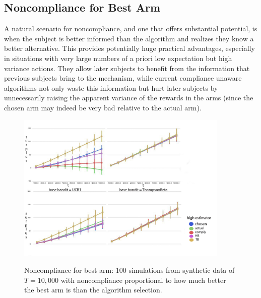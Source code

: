 \subsection{Noncompliance for Best Arm}


A natural scenario for noncompliance, and one that offers substantial potential, is when the subject is better informed than the algorithm and realizes they know a better alternative. 
This provides potentially huge practical advantages, especially in situations with very large numbers of a priori low expectation but high variance actions. 
They allow later subjects to benefit from the information that previous subjects bring to the mechanism, while current compliance unaware algorithms not only waste this information but hurt later subjects by unnecessarily raising the apparent variance of the rewards in the arms (since the chosen arm may indeed be very bad relative to the actual arm).



\begin{figure}[t]
	\centering	
	\includegraphics[width=0.9\textwidth]{bandit/figs/ex4.png}\hspace{1cm}
	\label{fig:ex4}
	\caption{Noncompliance for best arm: 100 simulations from synthetic data of $T=10,000$ with noncompliance proportional to how much better the best arm is than the algorithm selection.}
\end{figure}




